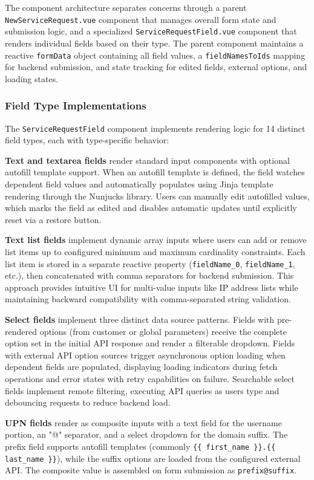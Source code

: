 The component architecture separates concerns through a parent \texttt{NewServiceRequest.vue} component that manages overall form state and submission logic, and a specialized \texttt{ServiceRequestField.vue} component that renders individual fields based on their type. The parent component maintains a reactive \texttt{formData} object containing all field values, a \texttt{fieldNamesToIds} mapping for backend submission, and state tracking for edited fields, external options, and loading states.

\subsubsection{Field Type Implementations}

The \texttt{ServiceRequestField} component implements rendering logic for 14 distinct field types, each with type-specific behavior:

\textbf{Text and textarea fields} render standard input components with optional autofill template support. When an autofill template is defined, the field watches dependent field values and automatically populates using Jinja template rendering through the Nunjucks library. Users can manually edit autofilled values, which marks the field as edited and disables automatic updates until explicitly reset via a restore button.

\textbf{Text list fields} implement dynamic array inputs where users can add or remove list items up to configured minimum and maximum cardinality constraints. Each list item is stored in a separate reactive property (\texttt{fieldName\_0}, \texttt{fieldName\_1}, etc.), then concatenated with comma separators for backend submission. This approach provides intuitive UI for multi-value inputs like IP address lists while maintaining backward compatibility with comma-separated string validation.

\textbf{Select fields} implement three distinct data source patterns. Fields with pre-rendered options (from customer or global parameters) receive the complete option set in the initial API response and render a filterable dropdown. Fields with external API option sources trigger asynchronous option loading when dependent fields are populated, displaying loading indicators during fetch operations and error states with retry capabilities on failure. Searchable select fields implement remote filtering, executing API queries as users type and debouncing requests to reduce backend load.

\textbf{UPN fields} render as composite inputs with a text field for the username portion, an "@" separator, and a select dropdown for the domain suffix. The prefix field supports autofill templates (commonly \texttt{\{\{ first\_name \}\}.\{\{ last\_name \}\}}), while the suffix options are loaded from the configured external API. The composite value is assembled on form submission as \texttt{prefix@suffix}.

